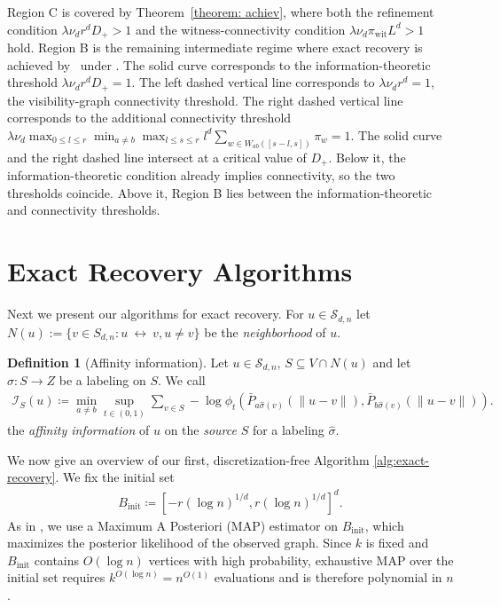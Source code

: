 \documentclass[11pt, a4paper]{amsart}
\newcommand{\1}{\mathbf{1}}
\newcommand{\visible}{\leftrightarrow{}}
\theoremstyle{definition}
\newtheorem{definition}[theorem]{Definition}
\theoremstyle{remark}
\theoremstyle{definition}
\begin{document}
Region C is covered by Theorem~\ref{theorem: achiev},
where both the refinement condition $\lambda \nu_d r^d D_+ > 1$ and the witness-connectivity condition $\lambda \nu_d \pi_{\mathrm{wit}}L^d > 1$ hold. Region B is the remaining intermediate regime where exact recovery is achieved by~\cite{gaudio2026jan} under \cite[Assumptions 1 and 3]{gaudio2025incguan}.
The solid curve corresponds to the information-theoretic threshold $\lambda\nu_d r^d D_+=1$. The left dashed vertical line corresponds to $\lambda\nu_d r^d=1$, the visibility-graph connectivity threshold. The right dashed vertical line corresponds to the additional connectivity threshold $\lambda\nu_d \max_{0\leq l\leq r} \min_{a\neq b} \max_{l\leq s\leq r}l^d\sum_{w\in W_{ab}([s-l,s])}\pi_w =1$. The solid curve and the right dashed line intersect at a critical value of $D_+$. Below it, the information-theoretic condition already implies connectivity, so the two thresholds coincide. Above it, Region B lies between the information-theoretic and connectivity thresholds.


\section{Exact Recovery Algorithms}
Next we present our algorithms for exact recovery. For $u \in \mathcal S_{d,n}$ let $N(u):=\{v \in S_{d,n}:u~\visible~v, u\neq v\}$ be the {\em neighborhood} of $u$.

\begin{definition}[Affinity information]\label{def:affinity_information}
    Let $u \in \mathcal S_{d,n}$, $S \subseteq V \cap N(u)$ and let $\hat \sigma:S \to Z$ be a labeling on $S$. We call
    \begin{align}
        \mathcal{I}_S(u) \coloneqq \min_{a \neq b} \sup_{t \in (0,1)} \sum_{v \in S} - \log  \phi_t \left(\bar P_{a \hat \sigma(v)}(\|u-v\|), \bar P_{b\hat\sigma(v)}(\|u-v\|)\right).\label{eq:def_I}
    \end{align}
    the \textit{affinity information} of $u$ on the \textit{source} $S$ for a labeling $\widehat{\sigma}$.
\end{definition}

We now give an overview of our first, discretization-free Algorithm \ref{alg:exact-recovery}. We  fix the initial set
\begin{align}
    B_{\mathrm{init}} \coloneqq [-r(\log n)^{1/d},r(\log n)^{1/d}]^d.
\end{align}
As in \cite{gaudio2026jan}, we use a Maximum A Posteriori (MAP) estimator on $B_{\mathrm{init}}$, which maximizes the posterior likelihood of the observed graph. Since $k$ is fixed and $B_{\mathrm{init}}$ contains $O(\log n)$ vertices with high probability, exhaustive MAP over the initial set requires
\(
k^{O(\log n)} = n^{O(1)}
\)
evaluations and is therefore polynomial in $n$.
\end{document}
